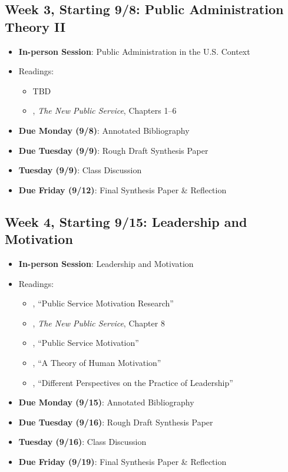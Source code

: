 \documentclass[12pt, letterpaper]{article}
\begin{document}
\subsection*{Week 3, Starting 9/8: Public Administration Theory II}
\begin{itemize}
    \item \textbf{In-person Session}: Public Administration in the U.S. Context
    \item Readings:
        \begin{itemize}
            \item TBD
            \item \citet{Denhardt2015}, \emph{The New Public Service}, Chapters 1--6 
        \end{itemize}
    \item \textbf{Due Monday (9/8)}: Annotated Bibliography
    \item \textbf{Due Tuesday (9/9)}: Rough Draft Synthesis Paper
    \item \textbf{Tuesday (9/9)}: Class Discussion
    \item \textbf{Due Friday (9/12)}: Final Synthesis Paper \& Reflection
\end{itemize}

\subsection*{Week 4, Starting 9/15: Leadership and Motivation}
\begin{itemize}
    \item \textbf{In-person Session}: Leadership and Motivation
    \item Readings:
        \begin{itemize}
            \item \citet{Christensen2017}, ``Public Service Motivation Research'' 
            \item \citet{Denhardt2015}, \emph{The New Public Service}, Chapter 8 
            \item \citet{Lachance2017}, ``Public Service Motivation'' 
            \item \citet{maslow1943}, ``A Theory of Human Motivation'' 
            \item \citet{Fairholm2004}, ``Different Perspectives on the Practice of Leadership'' 
        \end{itemize}
    \item \textbf{Due Monday (9/15)}: Annotated Bibliography
    \item \textbf{Due Tuesday (9/16)}: Rough Draft Synthesis Paper
    \item \textbf{Tuesday (9/16)}: Class Discussion
    \item \textbf{Due Friday (9/19)}: Final Synthesis Paper \& Reflection
\end{itemize}
\end{document}

